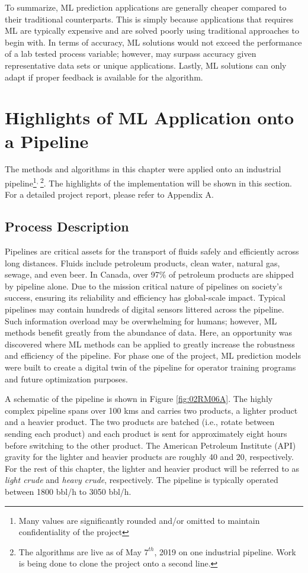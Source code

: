 To summarize, ML prediction applications are generally cheaper compared to their traditional counterparts.  This is simply because applications that requires ML are typically expensive and are solved poorly using traditional approaches to begin with.  In terms of accuracy, ML solutions would not exceed the performance of a lab tested process variable; however, may surpass accuracy given representative data sets or unique applications.  Lastly, ML solutions can only adapt if proper feedback is available for the algorithm. 

\section{Highlights of ML Application onto a Pipeline}

The methods and algorithms in this chapter were applied onto an industrial pipeline\footnote{Many values are significantly rounded and/or omitted to maintain confidentiality of the project}$^{, \;}$\footnote{The algorithms are live as of May $7^{th}$, 2019 on one industrial pipeline. Work is being done to clone the project onto a second line.}.  The highlights of the implementation will be shown in this section.  For a detailed project report, please refer to Appendix A.

\subsection{Process Description}
Pipelines are critical assets for the transport of fluids safely and efficiently across long distances. Fluids include petroleum products, clean water, natural gas, sewage, and even beer. In Canada, over 97\% of petroleum products are shipped by pipeline alone.  Due to the mission critical nature of pipelines on society's success, ensuring its reliability and efficiency has global-scale impact.  Typical pipelines may contain hundreds of digital sensors littered across the pipeline.  Such information overload may be overwhelming for humans; however, ML methods benefit greatly from the abundance of data.  Here, an opportunity was discovered where ML methods can be applied to greatly increase the robustness and efficiency of the pipeline.  For phase one of the project, ML prediction models were built to create a digital twin of the pipeline for operator training programs and future optimization purposes.

A schematic of the pipeline is shown in Figure \ref{fig:02RM06A}.  The highly complex pipeline spans over 100 kms and carries two products, a lighter product and a heavier product. The two products are batched (i.e., rotate between sending each product) and each product is sent for approximately eight hours before switching to the other product. The American Petroleum Institute (API) gravity for the lighter and heavier products are roughly 40 and 20, respectively. For the rest of this chapter, the lighter and heavier product will be referred to as \textit{light crude} and \textit{heavy crude}, respectively. The pipeline is typically operated between 1800 bbl/h to 3050 bbl/h. 


